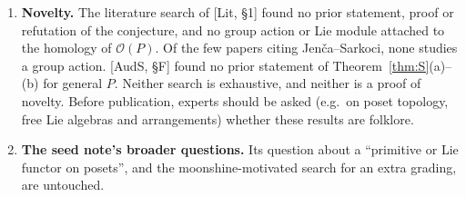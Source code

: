 \documentclass[11pt]{article}
\theoremstyle{definition}
\theoremstyle{remark}
\newcommand{\OP}{\mathcal O}
\begin{document}
\begin{enumerate}
\begin{itemize}[nosep]
    independent audit.
  \end{itemize}
\item \textbf{Novelty.} The literature search of [Lit, \S1] found no prior
  statement, proof or refutation of the conjecture, and no group action or
  Lie module attached to the homology of $\OP(P)$. Of the few papers citing
  Jen\v{c}a--Sarkoci, none studies a group action. [AudS, \S F] found no prior
  statement of Theorem~\ref{thm:S}(a)--(b) for general $P$. Neither search is
  exhaustive, and neither is a proof of novelty. Before publication, experts
  should be asked (e.g.\ on poset topology, free Lie algebras and
  arrangements) whether these results are folklore.
\item \textbf{The seed note's broader questions.} Its question about a
  ``primitive or Lie functor on posets'', and the moonshine-motivated search
  for an extra grading, are untouched.
\end{enumerate}
\end{document}
